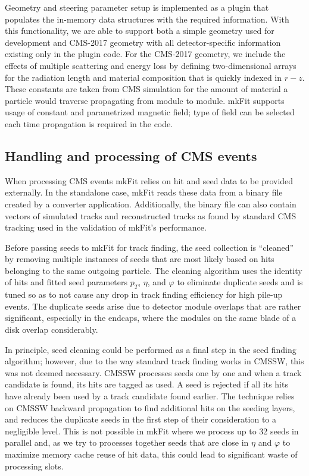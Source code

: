 \documentclass{webofc}
\def\mkfit{mkFit\xspace}
\begin{document}
Geometry and steering parameter setup is implemented as a plugin that
populates the in-memory data structures with the required information. With
this functionality, we are able to support both a simple geometry used for development and
CMS-2017 geometry with all detector-specific information existing only in the
plugin code. For the CMS-2017 geometry, we include the effects of multiple
scattering and energy loss by defining two-dimensional arrays for the
radiation length and material composition that is quickly indexed in
$r-z$. These constants are taken from CMS simulation for the amount of
material a particle would traverse propagating from module to module. \mkfit
supports usage of constant and parametrized magnetic field; type of field can
be selected each time propagation is required in the code.

\subsection{Handling and processing of CMS events}
\label{ssec:cms-event-processing}

When processing CMS events \mkfit relies on hit and seed data to be provided
externally. In the standalone case, \mkfit reads these data from a binary file
created by a converter application. Additionally, the binary file can also 
contain vectors of simulated tracks and reconstructed tracks as found by 
standard CMS tracking used in the validation of \mkfit's performance.

Before passing seeds to \mkfit for track finding, the seed collection is
``cleaned'' by removing multiple instances of seeds that are most likely 
based on hits belonging to the same outgoing particle. The cleaning
algorithm uses the identity of hits and fitted seed parameters $p_T$, $\eta$,
and $\varphi$ to eliminate duplicate seeds and is tuned so as to not cause any
drop in track finding efficiency for high pile-up events. The duplicate seeds
arise due to detector module overlaps that are rather significant, especially
in the endcaps, where the modules on the same blade of a disk overlap considerably.

In principle, seed cleaning could be performed as a final step in the seed
finding algorithm; however, due to the way standard track finding works in
CMSSW, this was not deemed necessary. CMSSW processes seeds one by one and
when a track candidate is found, its hits are tagged as used. A seed is
rejected if all its hits have already been used by a track candidate found
earlier. The technique relies on CMSSW backward propagation to find additional
hits on the seeding layers, and reduces the duplicate seeds in the first step
of their consideration to a negligible level. This is
not possible in \mkfit where we process up to 32 seeds in parallel and, as we
try to processes together seeds that are close in $\eta$ and $\varphi$ to
maximize memory cache reuse of hit data, this could lead to significant waste
of processing slots.
\end{document}
